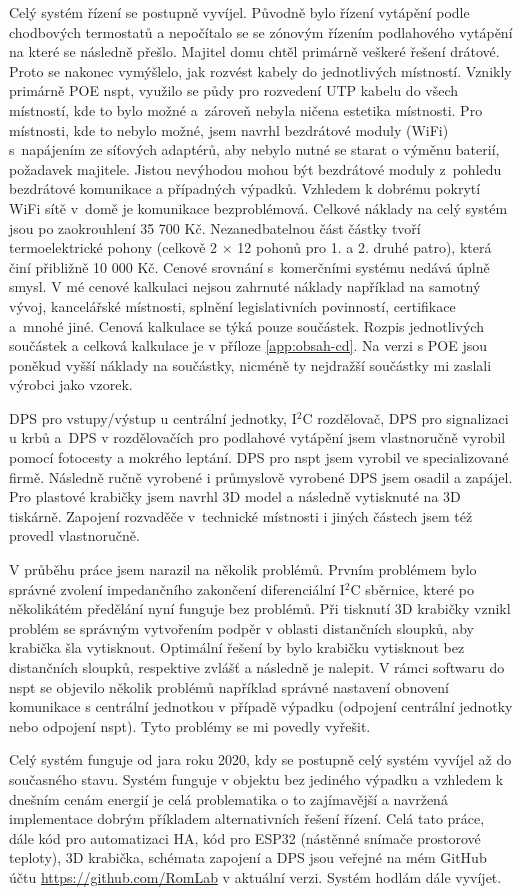 Celý systém řízení se postupně vyvíjel. Původně bylo řízení vytápění podle chodbových termostatů a nepočítalo se se zónovým řízením podlahového vytápění na které se následně přešlo. Majitel domu chtěl primárně veškeré řešení drátové. Proto se nakonec vymýšlelo, jak rozvést kabely do jednotlivých místností. Vznikly primárně POE \acrshort{nspt}, využilo se půdy pro rozvedení UTP kabelu do všech místností, kde to bylo možné a~zároveň nebyla ničena estetika místnosti. Pro místnosti, kde to nebylo možné, jsem navrhl bezdrátové moduly (WiFi) s~napájením ze síťových adaptérů, aby nebylo nutné se starat o výměnu baterií, požadavek majitele. Jistou nevýhodou mohou být bezdrátové moduly z~pohledu bezdrátové komunikace a případných výpadků. Vzhledem k dobrému pokrytí WiFi sítě v~domě je komunikace bezproblémová. Celkové náklady na celý systém jsou po zaokrouhlení 35 700 Kč. Nezanedbatelnou část částky tvoří termoelektrické pohony (celkově 2 × 12 pohonů pro 1. a 2. druhé patro), která činí přibližně 10 000 Kč. Cenové srovnání s~komerčními systému nedává úplně smysl. V mé cenové kalkulaci nejsou zahrnuté náklady například na samotný vývoj, kancelářské místnosti, splnění legislativních povinností, certifikace a~mnohé jiné. Cenová kalkulace se týká pouze součástek. Rozpis jednotlivých součástek a celková kalkulace je v příloze \ref{app:obsah-cd}.  Na verzi s POE jsou poněkud vyšší náklady na součástky, nicméně ty nejdražší součástky mi zaslali výrobci jako vzorek.

DPS pro vstupy/výstup u centrální jednotky, I$^{2}$C rozdělovač, DPS pro signalizaci u krbů a~DPS v rozdělovačích pro podlahové vytápění jsem vlastnoručně vyrobil pomocí fotocesty a mokrého leptání. DPS pro \acrshort{nspt} jsem vyrobil ve specializované firmě. Následně ručně vyrobené i průmyslově vyrobené DPS jsem osadil a zapájel. Pro plastové krabičky jsem navrhl 3D model a následně vytisknuté na 3D tiskárně. Zapojení rozvaděče v~technické místnosti i jiných částech jsem též provedl vlastnoručně.

V průběhu práce jsem narazil na několik problémů. Prvním problémem bylo správné zvolení impedančního zakončení diferenciální I$^{2}$C sběrnice, které po několikátém předělání nyní funguje bez problémů. Při tisknutí 3D krabičky vznikl problém se správným vytvořením podpěr v oblasti distančních sloupků, aby krabička šla vytisknout. Optimální řešení by bylo krabičku vytisknout bez distančních sloupků, respektive zvlášť a následně je nalepit. V rámci softwaru do \acrshort{nspt} se objevilo několik problémů například správné nastavení obnovení komunikace s centrální jednotkou v případě výpadku (odpojení centrální jednotky nebo odpojení \acrshort{nspt}). Tyto problémy se mi povedly vyřešit.

Celý systém funguje od jara roku 2020, kdy se postupně celý systém vyvíjel až do současného stavu. Systém funguje v objektu bez jediného výpadku a vzhledem k dnešním cenám energií je celá problematika o to zajímavější a navržená implementace dobrým příkladem alternativních řešení řízení. Celá tato práce, dále kód pro automatizaci HA, kód pro ESP32 (nástěnné snímače prostorové teploty), 3D krabička, schémata zapojení a DPS jsou veřejné na mém GitHub účtu \mbox{\url{https://github.com/RomLab}} v aktuální verzi. Systém hodlám dále vyvíjet.


